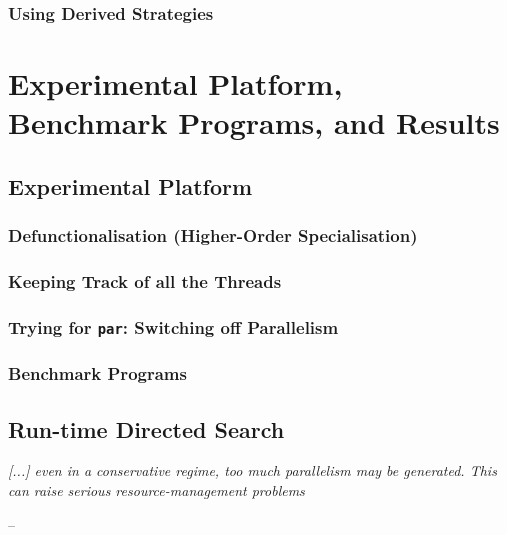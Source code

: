 \documentclass[openright, dottedtoc, headinclude, footinclude=true, a4paper, numbers=noenddot]{scrreprt}
\makeatletter
\newenvironment{chapquote}[2][2em]
  {\setlength{\@tempdima}{#1}%
   \def\chapquote@author{#2}%
   \parshape 1 \@tempdima \dimexpr\textwidth-2\@tempdima\relax%
   \itshape}
  {\par\normalfont\hfill--\ \chapquote@author\hspace*{\@tempdima}\par\noindent\hrulefill\\[1cm]}
\makeatother
\begin{document}
        \section{Using Derived Strategies}
        \label{sec:parPlacement}
        
    
    
\part{Experimental Platform, Benchmark Programs, and Results}
\label{part:implementation}

    \chapter{Experimental Platform} 
    \label{chap:platform}
    
    
        \section{Defunctionalisation (Higher-Order Specialisation)}
        \label{sec:defunctionalisation}
        
    
        \section{Keeping Track of all the Threads}
        \label{sec:logging}
        
    
        \section{Trying for \texttt{par}: Switching off Parallelism}
        \label{sec:parSwitching}
        

        \section{Benchmark Programs}
        \label{sec:benchmarks}
        
    
    \chapter{Run-time Directed Search}
    \label{chap:blind}
    \begin{chapquote}{\cite{peyton1987implementation}}
    [...] even in a conservative regime, too much parallelism may be generated.
    This can raise serious resource-management problems
    \end{chapquote}
    
    
\end{document}
